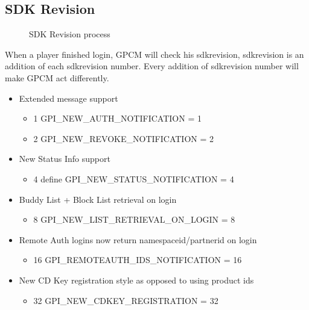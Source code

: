\documentclass[oneside,titlepage,a4paper]{Definition/retrospy} %
\begin{document}
\subsection{SDK Revision}

\begin{figure}[H]
	\centering
	\caption{SDK Revision process}
	\label{SDK Revision process}
\end{figure}
	When a player finished login, GPCM will check his sdkrevision, sdkrevision is an addition of each sdkrevision number. Every addition of sdkrevision number will make GPCM act differently.
\begin{tcolorbox}
	\begin{itemize}
		\item Extended message support
		\begin{itemize}
			\item{1} GPI\_NEW\_AUTH\_NOTIFICATION = 1
			\item{2} GPI\_NEW\_REVOKE\_NOTIFICATION = 2
		\end{itemize}
		
		\item New Status Info support
		\begin{itemize}
			\item{4} define GPI\_NEW\_STATUS\_NOTIFICATION = 4
		\end{itemize}
		
		\item Buddy List + Block List retrieval on login
		\begin{itemize}
			\item{8} GPI\_NEW\_LIST\_RETRIEVAL\_ON\_LOGIN = 8
		\end{itemize}
	\item Remote Auth logins now return namespaceid/partnerid on login
	\begin{itemize}
		\item{16} GPI\_REMOTEAUTH\_IDS\_NOTIFICATION = 16
	\end{itemize}

	\item New CD Key registration style as opposed to using product ids
	\begin{itemize}
		\item{32}  GPI\_NEW\_CDKEY\_REGISTRATION = 32
	\end{itemize}

	\end{itemize}
\end{tcolorbox}
\end{document}

